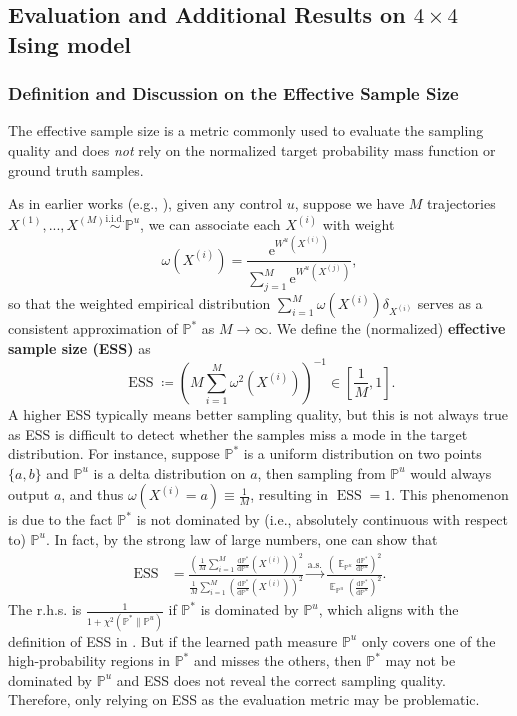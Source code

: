 \documentclass{article}
\theoremstyle{remark}
\newcommand{\ro}[1]{\left(#1\right)} %
\newcommand{\sq}[1]{\left[#1\right]} %
\newcommand{\e}{\mathrm{e}}
\renewcommand{\P}{\mathbb{P}}
\newcommand{\E}{\operatorname{\mathbb{E}}}
\newcommand{\iid}{\stackrel{\mathrm{i.i.d.}}{\sim}}
\newcommand{\asto}{\stackrel{\mathrm{a.s.}}{\longrightarrow}}
\newcommand{\de}[2]{\frac{\mathrm{d}#1}{\mathrm{d}#2}} %
\newcommand{\ess}{\operatorname{ESS}}
\begin{document}
\subsection{Evaluation and Additional Results on $4\times4$ Ising model}
\label{app:exp_ising4_eval}

\subsubsection{Definition and Discussion on the Effective Sample Size}
The effective sample size is a metric commonly used to evaluate the sampling quality and does \textit{not} rely on the normalized target probability mass function or ground truth samples.

As in earlier works (e.g., \cite{zhang2022path,albergo2025nets,holderrieth2025leaps}), given any control $u$, suppose we have $M$ trajectories $X^{(1)},...,X^{(M)}\iid\P^u$, we can associate each $X^{(i)}$ with weight 
$$\omega(X^{(i)})=\frac{\e^{W^u(X^{(i)})}}{\sum_{j=1}^M \e^{W^u(X^{(j)})}},$$
so that the weighted empirical distribution $\sum_{i=1}^M\omega(X^{(i)})\delta_{X^{(i)}}$ serves as a consistent approximation of $\P^*$ as $M\to\infty$. We define the (normalized) \textbf{effective sample size (ESS)} as 
\begin{equation}
    \ess\coloneqq \ro{M\sum_{i=1}^M \omega^2(X^{(i)})}^{-1}\in\sq{\frac{1}{M},1}.
    \label{eq:ess}        
\end{equation}
A higher ESS typically means better sampling quality, but this is not always true as ESS is difficult to detect whether the samples miss a mode in the target distribution. For instance, suppose $\P^*$ is a uniform distribution on two points $\{a,b\}$ and $\P^u$ is a delta distribution on $a$, then sampling from $\P^u$ would always output $a$, and thus $\omega(X^{(i)}=a)\equiv\frac{1}{M}$, resulting in $\ess=1$. This phenomenon is due to the fact $\P^*$ is not dominated by (i.e., absolutely continuous with respect to) $\P^u$. In fact, by the strong law of large numbers, one can show that
\begin{align*}
    \ess&=\frac{\ro{\frac{1}{M}\sum_{i=1}^M\de{\P^*}{\P^u}(X^{(i)})}^2}{\frac{1}{M}\sum_{i=1}^M\ro{\de{\P^*}{\P^u}(X^{(i)})}^2}\asto\frac{\ro{\E_{\P^u}\de{\P^*}{\P^u}}^2}{\E_{\P^u}\ro{\de{\P^*}{\P^u}}^2}.
\end{align*}
The r.h.s. is $\frac{1}{1+\chi^2(\P^*\|\P^u)}$ if $\P^*$ is dominated by $\P^u$, which aligns with the definition of ESS in \cite{zhang2022path}. But if the learned path measure $\P^u$ only covers one of the high-probability regions in $\P^*$ and misses the others, then $\P^*$ may not be dominated by $\P^u$ and ESS does not reveal the correct sampling quality. Therefore, only relying on ESS as the evaluation metric may be problematic.
\end{document}
